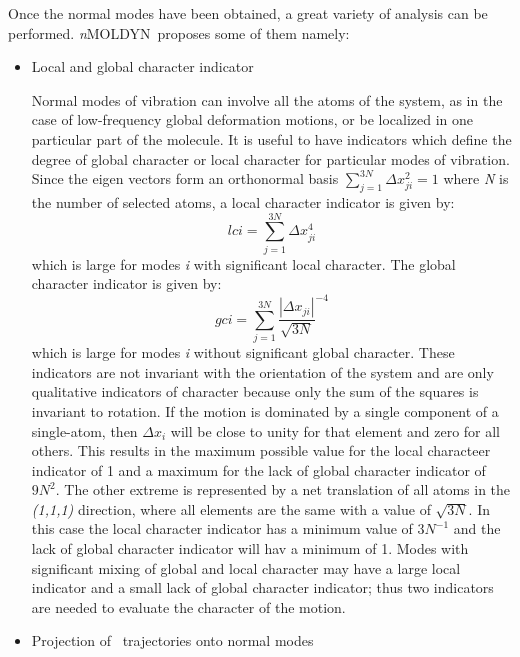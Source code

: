 \documentclass[a4paper,11pt]{report}
\newcommand{\NMOLDYN}{\textit{n}MOLDYN}
\begin{document}
Once the normal modes have been obtained, a great variety of analysis can be performed. \NMOLDYN\ proposes some of 
them namely:
\begin{itemize}
\item Local and global character indicator

Normal modes of vibration can involve all the atoms of the system, as in the case of low-frequency global deformation motions, or 
be localized in one particular part of the molecule. It is useful to have indicators which define the degree of global character or local 
character for particular modes of vibration. Since the eigen vectors form an orthonormal basis 
$\sum_{j = 1}^{3N} \Delta x_{ji}^2 = 1$ where \textit{N} is the number of selected atoms, a local character indicator is given by:
\begin{equation}
\label{eq:qha_lci}
lci = \sum_{j = 1}^{3N} \Delta x_{ji}^4
\end{equation}
which is large for modes \textit{i} with significant local character. The global character indicator is given by:
\begin{equation}
\label{eq:qha_gci}
gci = \sum_{j = 1}^{3N} \frac{|\Delta x_{ji}|}{\sqrt{3N}}^{-4}
\end{equation}
which is large for modes \textit{i} without significant global character. These indicators are not invariant with the orientation of the 
system and are only qualitative indicators of character because only the sum of the squares is invariant to rotation. If the motion is 
dominated by a single component of a single-atom, then $\Delta x_i$ will be close to unity for that element and zero for all others. This
results in the maximum possible value for the local characteer indicator of 1 and a maximum for the lack of global character 
indicator of $9N^2$. The other extreme is represented by a net translation of all atoms in the \textit{(1,1,1)} direction, where all elements are the 
same with a value of $\sqrt{3N}$. In this case the local character indicator has a minimum value of $3N^{-1}$ and the lack of global character 
indicator will hav a minimum of 1. Modes with significant mixing of global and local character may have a large local indicator and a small lack of global 
character indicator; thus two indicators are needed to evaluate the character of the motion.

\item Projection of \MD\ trajectories onto normal modes


\end{itemize}
\end{document}
